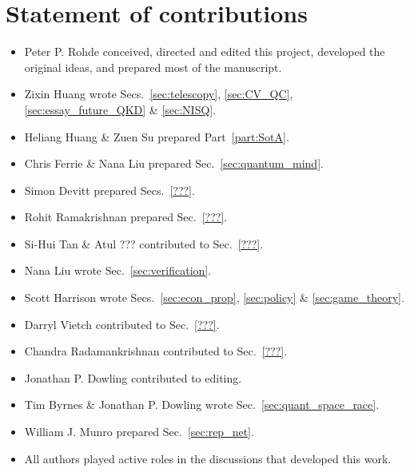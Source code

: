 %
%

\section*{Statement of contributions}

\begin{itemize}
\item Peter P. Rohde conceived, directed and edited this project, developed the original ideas, and prepared most of the manuscript.
\item Zixin Huang wrote Secs.~\ref{sec:telescopy}, \ref{sec:CV_QC}, \ref{sec:essay_future_QKD} \& \ref{sec:NISQ}.
\item Heliang Huang \& Zuen Su prepared Part~\ref{part:SotA}.
\item Chris Ferrie \& Nana Liu prepared Sec.~\ref{sec:quantum_mind}.
\item Simon Devitt prepared Secs.~\ref{???}.
\item Rohit Ramakrishnan prepared Sec.~\ref{???}.
\item Si-Hui Tan \& Atul ??? contributed to Sec.~\ref{???}.
\item Nana Liu wrote Sec.~\ref{sec:verification}.
\item Scott Harrison wrote Secs.~\ref{sec:econ_prop}, \ref{sec:policy} \& \ref{sec:game_theory}.
\item Darryl Vietch contributed to Sec.~\ref{???}.
\item Chandra Radamankrishnan contributed to Sec.~\ref{???}.
\item Jonathan P. Dowling contributed to editing.
\item Tim Byrnes \& Jonathan P. Dowling wrote Sec.~\ref{sec:quant_space_race}.
\item William J. Munro prepared Sec.~\ref{sec:rep_net}. 
\item All authors played active roles in the discussions that developed this work. 
\end{itemize}